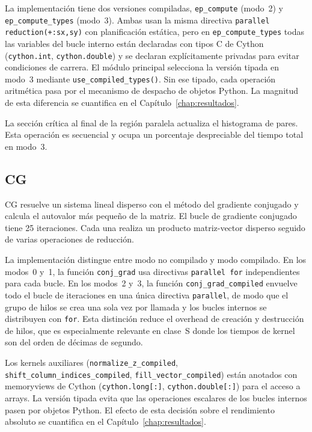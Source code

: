 La implementación tiene dos versiones compiladas, \texttt{ep\_compute} (modo~2)
y \texttt{ep\_compute\_types} (modo~3). Ambas usan la misma directiva
\texttt{parallel reduction(+:sx,sy)} con planificación estática, pero en
\texttt{ep\_compute\_types} todas las variables del bucle interno están
declaradas con tipos C de Cython (\texttt{cython.int}, \texttt{cython.double})
y se declaran explícitamente privadas para evitar condiciones de carrera. El
módulo principal selecciona la versión tipada en modo~3 mediante
\texttt{use\_compiled\_types()}. Sin ese tipado, cada operación aritmética pasa
por el mecanismo de despacho de objetos Python. La magnitud de esta diferencia
se cuantifica en el Capítulo~\ref{chap:resultados}.

La sección crítica al final de la región paralela actualiza el histograma de
pares. Esta operación es secuencial y ocupa un porcentaje despreciable del
tiempo total en modo~3.

\subsection{CG}
CG resuelve un sistema lineal disperso con el método del gradiente conjugado y
calcula el autovalor más pequeño de la matriz. El bucle de gradiente conjugado
tiene 25 iteraciones. Cada una realiza un producto matriz-vector disperso
seguido de varias operaciones de reducción.

La implementación distingue entre modo no compilado y modo compilado. En los
modos~0 y~1, la función \texttt{conj\_grad} usa directivas
\texttt{parallel~for} independientes para cada bucle. En los modos~2 y~3, la
función \texttt{conj\_grad\_compiled} envuelve todo el bucle de iteraciones en
una única directiva \texttt{parallel}, de modo que el grupo de hilos se crea
una sola vez por llamada y los bucles internos se distribuyen con
\texttt{for}. Esta distinción reduce el overhead de creación y destrucción de
hilos, que es especialmente relevante en clase~S donde los tiempos de kernel
son del orden de décimas de segundo.

Los kernels auxiliares (\texttt{normalize\_z\_compiled},
\texttt{shift\_column\_indices\_compiled}, \texttt{fill\_vector\_compiled})
están anotados con memoryviews de Cython (\texttt{cython.long[:]},
\texttt{cython.double[:]}) para el acceso a arrays. La versión tipada evita que
las operaciones escalares de los bucles internos pasen por objetos Python. El
efecto de esta decisión sobre el rendimiento absoluto se cuantifica en el
Capítulo~\ref{chap:resultados}.

